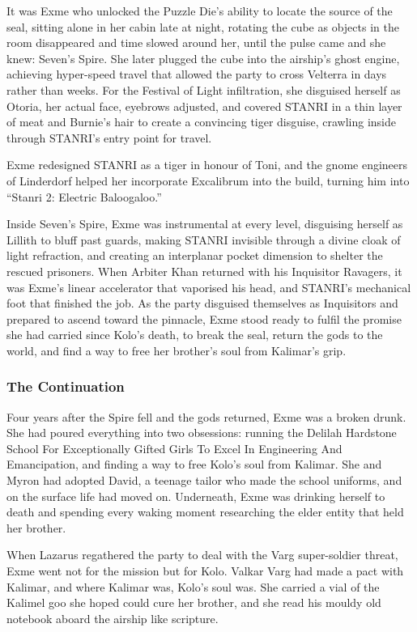 It was Exme who unlocked the Puzzle Die's ability to locate the source of the seal, sitting alone in her cabin late at night, rotating the cube as objects in the room disappeared and time slowed around her, until the pulse came and she knew: Seven's Spire.  She later plugged the cube into the airship's ghost engine, achieving hyper-speed travel that allowed the party to cross Velterra in days rather than weeks.  For the Festival of Light infiltration, she disguised herself as Otoria, her actual face, eyebrows adjusted, and covered STANRI in a thin layer of meat and Burnie's hair to create a convincing tiger disguise, crawling inside through STANRI's entry point for travel.

Exme redesigned STANRI as a tiger in honour of Toni, and the gnome engineers of Linderdorf helped her incorporate Excalibrum into the build, turning him into ``Stanri 2: Electric Baloogaloo.''

Inside Seven's Spire, Exme was instrumental at every level, disguising herself as Lillith to bluff past guards, making STANRI invisible through a divine cloak of light refraction, and creating an interplanar pocket dimension to shelter the rescued prisoners.  When Arbiter Khan returned with his Inquisitor Ravagers, it was Exme's linear accelerator that vaporised his head, and STANRI's mechanical foot that finished the job.  As the party disguised themselves as Inquisitors and prepared to ascend toward the pinnacle, Exme stood ready to fulfil the promise she had carried since Kolo's death, to break the seal, return the gods to the world, and find a way to free her brother's soul from Kalimar's grip.

\subsubsection{The Continuation}

Four years after the Spire fell and the gods returned, Exme was a broken drunk.  She had poured everything into two obsessions: running the Delilah Hardstone School For Exceptionally Gifted Girls To Excel In Engineering And Emancipation, and finding a way to free Kolo's soul from Kalimar.  She and Myron had adopted David, a teenage tailor who made the school uniforms, and on the surface life had moved on.  Underneath, Exme was drinking herself to death and spending every waking moment researching the elder entity that held her brother.

When Lazarus regathered the party to deal with the Varg super-soldier threat, Exme went not for the mission but for Kolo.  Valkar Varg had made a pact with Kalimar, and where Kalimar was, Kolo's soul was.  She carried a vial of the Kalimel goo she hoped could cure her brother, and she read his mouldy old notebook aboard the airship like scripture.

